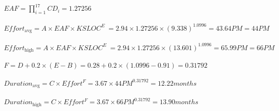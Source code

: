 	\paragraph{}\(EAF = \prod_{i=1}^{17}CD_i = 1.27256\)\\
	
	\paragraph{}\(Effort_{\text{avg}} = A \times EAF \times KSLOC^E\ = 2.94 \times 1.27256 \times (9.338)^{1.0996} = 43.64 PM = 44 PM\)\\
	
	\paragraph{}\(Effort_{\text{high}} = A \times EAF \times KSLOC^E\ = 2.94 \times 1.27256 \times (13.601)^{1.0996} = 65.99 PM = 66 PM\)\\

	\paragraph{}\(F = D + 0.2 \times (E - B) = 0.28 + 0.2 \times ( 1.0996 - 0.91 ) = 0.31792\)\\
	
	\paragraph{}\(Duration_{\text{avg}} = C \times Effort^F = 3.67 \times 44PM^{0.31792} = 12.22 months\)\\
	
	\paragraph{}\(Duration_{\text{high}} = C \times Effort^F = 3.67 \times 66PM^{0.31792} = 13.90 months\)\\